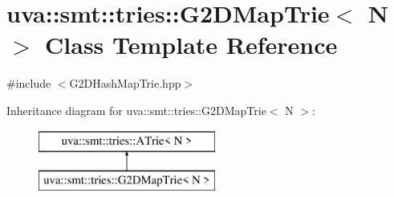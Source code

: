 \hypertarget{classuva_1_1smt_1_1tries_1_1_g2_d_map_trie}{}\section{uva\+:\+:smt\+:\+:tries\+:\+:G2\+D\+Map\+Trie$<$ N $>$ Class Template Reference}
\label{classuva_1_1smt_1_1tries_1_1_g2_d_map_trie}


{\ttfamily \#include $<$G2\+D\+Hash\+Map\+Trie.\+hpp$>$}

Inheritance diagram for uva\+:\+:smt\+:\+:tries\+:\+:G2\+D\+Map\+Trie$<$ N $>$\+:\begin{figure}[H]
\begin{center}
\leavevmode
\includegraphics[height=2.000000cm]{classuva_1_1smt_1_1tries_1_1_g2_d_map_trie}
\end{center}
\end{figure}
